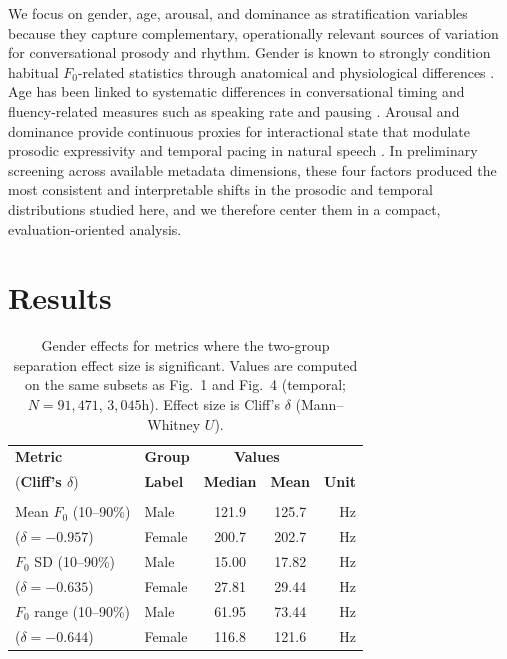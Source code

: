 \documentclass{Interspeech}
\begin{document}
We focus on gender, age, arousal, and dominance as stratification variables because they capture complementary, operationally relevant sources of variation for conversational prosody and rhythm. 
Gender is known to strongly condition habitual $F_0$-related statistics through anatomical and physiological differences \cite{traunmuller_acoustic_2000, titze_toward_1994}. 
Age has been linked to systematic differences in conversational timing and fluency-related measures such as speaking rate and pausing \cite{tauroza_speech_1990, goldman1958speech, goldman1961significance}. 
Arousal and dominance provide continuous proxies for interactional state that modulate prosodic expressivity and temporal pacing in natural speech \cite{banziger_role_2005, pell_emotional_2011, banse1996acoustic}. 
In preliminary screening across available metadata dimensions, these four factors produced the most consistent and interpretable shifts in the prosodic and temporal distributions studied here, and we therefore center them in a compact, evaluation-oriented analysis.

\section{Results}\label{sec:regimes}

\begin{table}[t]
\centering
\caption{Gender effects for metrics where the two-group separation effect size is significant. Values are computed on the same subsets as Fig.~1 and Fig.~4 (temporal; $N{=}91{,}471$, $3{,}045$h). Effect size is Cliff's $\delta$ (Mann--Whitney $U$).}
\label{tab:gender_effects}
\small
\setlength{\tabcolsep}{4pt}
\begin{tabular}{l l c c r}
\toprule
\textbf{Metric} & \textbf{Group} & \multicolumn{2}{c}{\textbf{Values}} \\
(\textbf{Cliff's $\delta$}) & \textbf{Label} & \textbf{Median} & \textbf{Mean} & \textbf{Unit}\\
\midrule
\rowcolor{gray!20}\multicolumn{5}{c}{\textbf{Prosody (Fig.~1)}} \\
Mean $F_0$ (10--90\%)     & Male   & 121.9 & 125.7 & Hz\\
($\delta=-0.957$)         & Female & 200.7 & 202.7 & Hz\\
$F_0$ SD (10--90\%)       & Male   & 15.00 & 17.82 & Hz\\
($\delta=-0.635$)         & Female & 27.81 & 29.44 & Hz\\
$F_0$ range (10--90\%)    & Male   & 61.95 & 73.44 & Hz\\
($\delta=-0.644$)         & Female & 116.8 & 121.6 & Hz\\
\bottomrule
\end{tabular}
\end{table}
\end{document}
